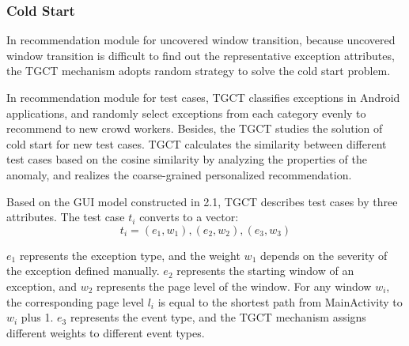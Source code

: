 \subsubsection{Cold Start}
In recommendation module for uncovered window transition, because uncovered window transition is difficult to find out the representative exception attributes, the TGCT mechanism adopts random strategy to solve the cold start problem. 


In recommendation module for test cases, TGCT classifies exceptions in Android applications, and randomly select exceptions from each category evenly to recommend to new crowd workers. Besides, the TGCT studies the solution of cold start for new test cases. TGCT calculates the similarity between different test cases based on the cosine similarity by analyzing the properties of the anomaly, and realizes the coarse-grained personalized recommendation.

Based on the GUI model constructed in 2.1, TGCT describes test cases by three attributes. The test case $t_{i}$ converts to a vector:
\begin{equation}
t_{i} = {(e_{1}, w_{1}),(e_{2}, w_{2}),(e_{3}, w_{3})}
\end{equation}

$e_{1}$ represents the exception type, and the weight $w_{1}$ depends on the severity of the exception defined manually. $e_{2}$ represents the starting window of an exception, and $w_{2}$ represents the page level of the window. For any window $w_{i}$, the corresponding page level $l_{i}$ is equal to the shortest path from MainActivity to $w_{i}$ plus 1.
$e_{3}$ represents the event type, and the TGCT mechanism assigns different weights to different event types.

